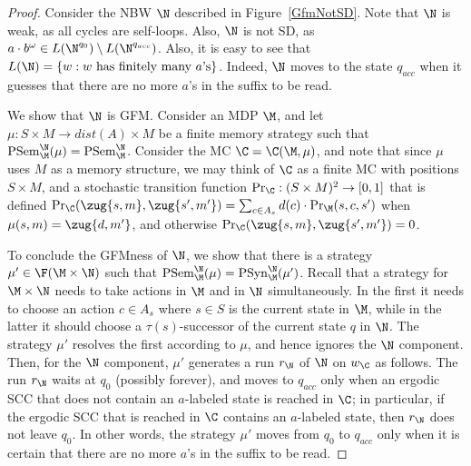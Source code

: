 \documentclass{lmcs}
\begin{document}
\begin{proof}
		Consider the NBW $\N$ described in Figure~\ref{GfmNotSD}. Note that $\N$ is weak, as all cycles are self-loops. Also, $\N$ is not SD, as $a\cdot b^\omega \in L( \N^{q_0}) \setminus L(\N^{q_{acc}})$. 
		Also, it is easy to see that $L(\N) = \{w: \text{$w$ has finitely many $a$'s}\}$. Indeed, $\N$ moves to the state $q_{acc}$ when it guesses that there are no more $a$'s in the suffix to be read.
		
		We show that $\N$ is GFM. 
		Consider an MDP $\M$, and let $\mu: S\times M \to dist(A) \times M$ be a finite memory strategy such that $\mathrm{PSem}^\N_\M(\mu) = \mathrm{PSem}^\N_{\M}$.  Consider the MC $\C=\C(\M,\mu)$, and  note that since $\mu$ uses $M$ as a memory structure, we may think of $\C$ as a finite MC with positions $S\times M$, and a stochastic transition function $\Pr_\C:(S\times M)^2\rightarrow[0,1]$ that is defined $\Pr_\C(\zug{s,m},\zug{s',m'})=\sum_{c\in A_s}d(c) \cdot \Pr_{\M}(s,c,s')$ when $\mu(s,m)=\zug{d,m'}$, and otherwise $\Pr_\C(\zug{s,m},\zug{s',m'})=0$. 
		
		To conclude the GFMness of $\N$, we show that there is a strategy $\mu'\in \F(\M\times \N)$ such that $\mathrm{PSem}^\N_\M(\mu) = \mathrm{PSyn}^\N_\M(\mu')$. 	
		Recall that a strategy for $\M\times \N$ needs to take actions in $\M$ and in $\N$ simultaneously.  In the first it needs to choose an action $c\in A_s$ where $s\in S$ is the current state in $\M$, while in the latter it should choose a $\tau(s)$-successor of the current state $q$ in $\N$. The strategy $\mu'$ resolves the first according to $\mu$, and hence ignores the $\N$ component. Then, for the $\N$ component, $\mu'$ generates a run $r_\N$ of $\N$ on $w_\C$ as follows. The run $r_\N$ waits at $q_0$ (possibly forever), and moves to $q_{acc}$ only when an ergodic SCC that does not contain an $a$-labeled state is reached in $\C$; in particular, if the ergodic SCC that is reached in $\C$ contains an $a$-labeled state, then $r_\N$ does not leave $q_0$. In other words, the strategy $\mu'$ moves from $q_0$ to $q_{acc}$ only when it is certain that there are no more $a$'s in the suffix to be read.
	

\end{proof}
\end{document}
